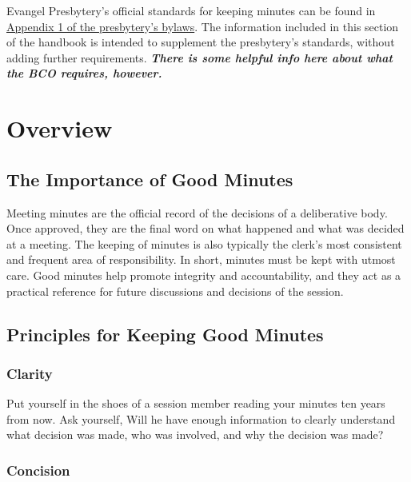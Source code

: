 \documentclass[
]{book}
\begin{document}
Evangel Presbytery's official standards for keeping minutes can be found in \href{https://docs.google.com/document/d/1WZ4PrWPCNPNsUEmfXLPNXCNJz5qaB09T3HXnCkPh2ak/edit?usp=sharing}{Appendix 1 of the presbytery's bylaws}. The information included in this section of the handbook is intended to supplement the presbytery's standards, without adding further requirements. \textbf{\emph{There is some helpful info here about what the BCO requires, however.}}

\hypertarget{overview-1}{%
\section{Overview}\label{overview-1}}

\hypertarget{the-importance-of-good-minutes}{%
\subsection{The Importance of Good Minutes}\label{the-importance-of-good-minutes}}

Meeting minutes are the official record of the decisions of a deliberative body. Once approved, they are the final word on what happened and what was decided at a meeting. The keeping of minutes is also typically the clerk's most consistent and frequent area of responsibility. In short, minutes must be kept with utmost care. Good minutes help promote integrity and accountability, and they act as a practical reference for future discussions and decisions of the session.

\hypertarget{principles-for-keeping-good-minutes}{%
\subsection{Principles for Keeping Good Minutes}\label{principles-for-keeping-good-minutes}}

\hypertarget{clarity}{%
\subsubsection{Clarity}\label{clarity}}

Put yourself in the shoes of a session member reading your minutes ten years from now. Ask yourself, Will he have enough information to clearly understand what decision was made, who was involved, and why the decision was made?

\hypertarget{concision}{%
\subsubsection{Concision}\label{concision}}
\end{document}
